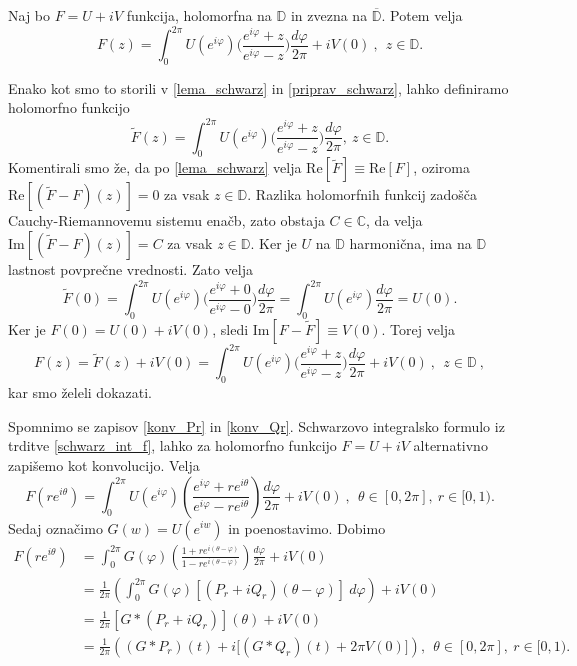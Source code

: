 \documentclass[mat1, tisk]{fmfdelo}
\begin{document}
    \begin{trditev}
        \label{schwarz_int_f}
        Naj bo $F = U + iV$ funkcija, holomorfna na $\mathbb{D}$ in zvezna na $\overline{\mathbb{D}}$. Potem velja
        $$ 
            F(z) = \int_{0}^{2 \pi}{U(e^{i \varphi})\bigg(\frac{e^{i\varphi}+z}{e^{i\varphi}-z}\bigg)\frac{d \varphi}{2 \pi}} + i V(0)~,~~z \in \mathbb{D}.
        $$
    \end{trditev}
    \begin{dokaz}
        Enako kot smo to storili v \eqref{lema_schwarz} in \eqref{priprav_schwarz}, lahko definiramo holomorfno funkcijo
        $$
        \widetilde{F}(z) = \int_{0}^{2 \pi}{U(e^{i \varphi})\bigg(\frac{e^{i\varphi}+z}{e^{i\varphi}-z}\bigg)\frac{d \varphi}{2 \pi}},~z \in \mathbb{D}.
        $$
        Komentirali smo že, da po \eqref{lema_schwarz} velja $\text{Re}[\widetilde{F}] \equiv \text{Re}[F]$, oziroma $\text{Re}[(\widetilde{F} - F)(z)] = 0$ za vsak $z \in \mathbb{D}$. 
        Razlika holomorfnih funkcij zadošča Cauchy-Riemannovemu sistemu enačb, zato obstaja $C \in \mathbb{C}$, da velja $\text{Im}[(\widetilde{F} - F)(z)] = C$ za vsak $z \in \mathbb{D}$.
        Ker je $U$ na $\mathbb{D}$ harmonična, ima na $\mathbb{D}$ lastnost povprečne vrednosti. Zato velja
        $$
        \widetilde{F}(0) = \int_{0}^{2 \pi}{U(e^{i \varphi})\bigg(\frac{e^{i\varphi}+0}{e^{i\varphi}-0}\bigg)\frac{d \varphi}{2 \pi}} = \int_{0}^{2 \pi}{U(e^{i \varphi})\frac{d \varphi}{2 \pi}} = U(0).
        $$
        Ker je $F(0) = U(0) + iV(0)$, sledi $\text{Im}[F - \widetilde{F}] \equiv V(0)$.
        Torej velja
        $$ 
        F(z) = \widetilde{F}(z) + iV(0) = \int_{0}^{2 \pi}{U(e^{i \varphi})\bigg(\frac{e^{i\varphi}+z}{e^{i\varphi}-z}\bigg)\frac{d \varphi}{2 \pi}} + i V(0)~,~~z \in \mathbb{D}~,
        $$
        kar smo želeli dokazati.
    \end{dokaz}

    Spomnimo se zapisov \eqref{konv_Pr} in \eqref{konv_Qr}. Schwarzovo integralsko formulo iz trditve \ref{schwarz_int_f}, lahko za holomorfno funkcijo $F = U + iV$ alternativno zapišemo kot konvolucijo. Velja
    $$
        F(r e^{i \theta}) = \int_{0}^{2 \pi}{U(e^{i \varphi})\left(\frac{e^{i \varphi}+r e^{i \theta}}{e^{i \varphi}-r e^{i \theta}}\right)\frac{d \varphi}{2 \pi}} + i V(0)~,~~\theta \in [0,2 \pi],~r \in [0,1).
    $$
    Sedaj označimo $G(w) = U(e^{iw})$ in poenostavimo. Dobimo
    \begin{align*}
        F(r e^{i \theta}) & = \int_{0}^{2 \pi}{G(\varphi)\left(\frac{1 +r e^{i (\theta-\varphi)}}{1-r e^{i(\theta-\varphi)}}\right)}\frac{d\varphi}{2 \pi} + iV(0)\\
        & = \frac{1}{2 \pi} \left(\int_{0}^{2 \pi}{G(\varphi)[(P_r + i Q_r)(\theta - \varphi)]}~d\varphi\right)+  iV(0) \\
        & = \frac{1}{2 \pi} \left[G * (P_r + iQ_r)\right](\theta) + iV(0)\\
        & = \frac{1}{2 \pi}\left((G * P_r)(t) + i\big[(G * Q_r)(t) + 2 \pi V(0)\big]\right),~~\theta\in [0,2 \pi],~r \in [0,1).
    \end{align*}
\end{document}
